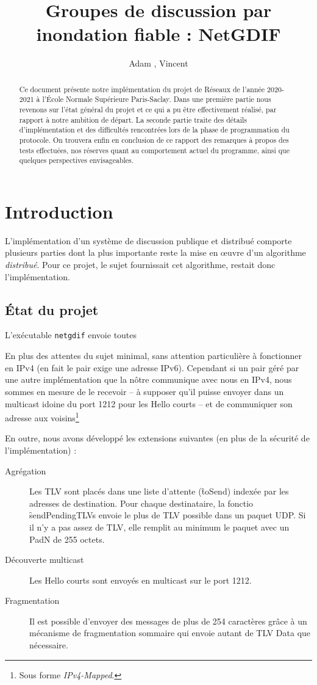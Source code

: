 \documentclass[11pt,a4paper]{article}
\title{Groupes de discussion par inondation fiable : NetGDIF}
\author{Adam \bsc{Phillips}, Vincent \bsc{Bonczak}}
\begin{document}
  \maketitle
	
	\begin{abstract}
	Ce document présente notre implémentation du projet de Réseaux de l'année 2020-2021 à l'École Normale Supérieure Paris-Saclay. Dans une première partie
	nous revenons sur l'état général du projet et ce qui a pu être effectivement réalisé, par rapport à notre ambition de départ. La seconde partie traite 
	des détails d'implémentation et des difficultés rencontrées lors de la phase de programmation du protocole. On trouvera enfin en conclusion de ce rapport
	des remarques à propos des tests effectuées, nos réserves quant au comportement actuel du programme, ainsi que quelques perspectives envisageables.
	\end{abstract}
	
	
\section{Introduction}

L'implémentation d'un système de discussion publique et distribué comporte plusieurs parties dont la plus importante reste la mise en œuvre d'un algorithme \emph{distribué}. Pour ce projet, le sujet fournissait cet algorithme, restait donc l'implémentation.

\subsection{État du projet}

L'exécutable \texttt{netgdif} envoie toutes 

En plus des attentes du sujet minimal, sans attention particulière à fonctionner en IPv4 (en fait le pair exige une adresse IPv6). Cependant si un pair géré par
une autre implémentation que la nôtre communique avec nous en IPv4, nous sommes en mesure de le recevoir -- à supposer qu'il puisse envoyer dans un multicast 
idoine du port 1212 pour les Hello courts -- et de communiquer son adresse aux voisins\footnote{Sous forme \emph{IPv4-Mapped}.} 

En outre, nous avons développé les extensions suivantes (en plus de la sécurité de l'implémentation) :
\begin{description}
\item[Agrégation] Les TLV sont placés dans une liste d'attente (\f{toSend}) indexée par les adresses de destination. Pour chaque destinataire, la fonctio \f{sendPendingTLVs}
envoie le plus de TLV possible dans un paquet UDP. Si il n'y a pas assez de TLV, elle remplit au minimum le paquet avec un PadN de 255 octets.
\item[Découverte multicast]Les Hello courts sont envoyés en multicast sur le port 1212.

\item[Fragmentation] Il est possible d'envoyer des messages de plus de 254 caractères grâce à un mécanisme de fragmentation sommaire qui envoie autant de 
TLV Data que nécessaire.
\end{description}
\end{document}
